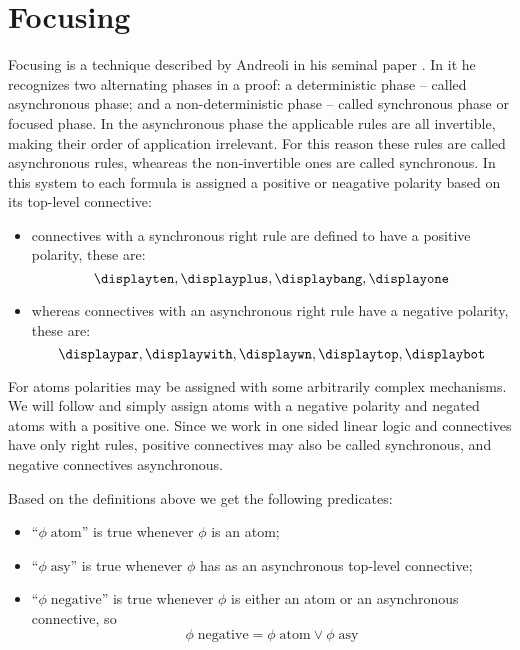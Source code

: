 \section{Focusing}
Focusing is a technique described by Andreoli in his seminal paper \cite{Focusing}.
In it he recognizes two alternating phases in a proof: a deterministic phase -- called asynchronous phase; and a non-deterministic phase -- called synchronous phase or focused phase.
In the asynchronous phase the applicable rules are all invertible, making their order of application irrelevant.
For this reason these rules are called asynchronous rules, wheareas the non-invertible ones are called synchronous.
In this system to each formula is assigned a positive or neagative polarity based on its top-level connective:
\begin{itemize}
	\item connectives with a synchronous right rule are defined to have a positive polarity, these are:
		$$ \displayten, \displayplus, \displaybang, \displayone$$
	\item whereas connectives with an asynchronous right rule have a negative polarity, these are:
		$$ \displaypar, \displaywith, \displaywn, \displaytop, \displaybot$$
\end{itemize}
For atoms polarities may be assigned with some arbitrarily complex mechanisms.
We will follow \cite{LiangMiller} and simply assign atoms with a negative polarity and negated atoms with a positive one.
Since we work in one sided linear logic and connectives have only right rules, positive connectives may also be called synchronous, and negative connectives asynchronous.
\begin{define}\label{def:focusing predicates}
	Based on the definitions above we get the following predicates:
	\begin{itemize}
		\item ``$\phi \; \mathrm{atom}$'' is true whenever $\phi$ is an atom;
		\item ``$\phi \; \mathrm{asy}$'' is true whenever $\phi$ has as an asynchronous top-level connective;
		\item ``$\phi \; \mathrm{negative}$'' is true whenever $\phi$ is either an atom or an asynchronous connective, so
			$$ \phi \; \mathrm{negative} = \phi \; \mathrm{atom} \vee \phi \; \mathrm{asy} $$
	\end{itemize}
\end{define}

